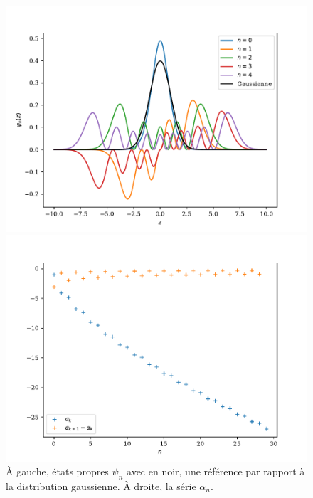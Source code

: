 \begin{figure}[t]
	\begin{minipage}[t]{0.5\linewidth}
        \includegraphics[width=\linewidth]{sosequi-laser/etats-laser.pdf}
	\end{minipage}%
	\begin{minipage}[t]{0.5\linewidth}
    	\includegraphics[width=\linewidth]{sosequi-laser/energies-laser.pdf}
	\end{minipage}
    \caption{À gauche, états propres $\psi_n$ avec en noir, une référence par rapport à la distribution gaussienne. À droite, la série $\alpha_n$.}
	\label{fig-airy}    
\end{figure}

